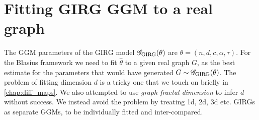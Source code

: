 









\section{Fitting GIRG GGM to a real graph}
The GGM parameters of the GIRG model $\mathscr{G}_{\mathrm{GIRG}}(\theta)$ are $\theta = (n, d, c, \alpha, \tau)$. For the Blasius framework we need to fit $\hat{\theta}$ to a given real graph $G$, as the best estimate for the parameters that would have generated $G \sim \mathscr{G}_{\mathrm{GIRG}}(\theta)$. The problem of fitting dimension $d$ is a tricky one that we touch on briefly in \cref{chap:diff_maps}. We also attempted to use \textit{graph fractal dimension} to infer $d$ without success. We instead avoid the problem by treating 1d, 2d, 3d etc. GIRGs as separate GGMs, to be individually fitted and inter-compared.

